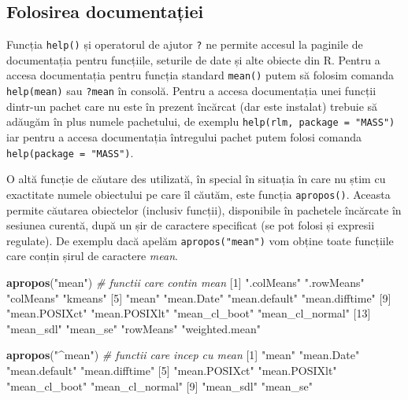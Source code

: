 \documentclass[]{article}
\newenvironment{Shaded}{\begin{snugshade}}{\end{snugshade}}
\newcommand{\CommentTok}[1]{\textcolor[rgb]{0.56,0.35,0.01}{\textit{#1}}}
\newcommand{\DecValTok}[1]{\textcolor[rgb]{0.00,0.00,0.81}{#1}}
\newcommand{\KeywordTok}[1]{\textcolor[rgb]{0.13,0.29,0.53}{\textbf{#1}}}
\newcommand{\NormalTok}[1]{#1}
\newcommand{\StringTok}[1]{\textcolor[rgb]{0.31,0.60,0.02}{#1}}
\begin{document}
\hypertarget{folosirea-documentaux21biei}{%
\subsection{Folosirea documentației}\label{folosirea-documentaux21biei}}

Funcția \texttt{help()} și operatorul de ajutor \texttt{?} ne permite
accesul la paginile de documentația pentru funcțiile, seturile de date
și alte obiecte din R. Pentru a accesa documentația pentru funcția
standard \texttt{mean()} putem să folosim comanda \texttt{help(mean)}
sau \texttt{?mean} în consolă. Pentru a accesa documentația unei funcții
dintr-un pachet care nu este în prezent încărcat (dar este instalat)
trebuie să adăugăm în plus numele pachetului, de exemplu
\texttt{help(rlm,\ package\ =\ "MASS")} iar pentru a accesa documentația
întregului pachet putem folosi comanda
\texttt{help(package\ =\ "MASS")}.

O altă funcție de căutare des utilizată, în special în situația în care
nu știm cu exactitate numele obiectului pe care îl căutăm, este funcția
\texttt{apropos()}. Aceasta permite căutarea obiectelor (inclusiv
funcții), disponibile în pachetele încărcate în sesiunea curentă, după
un șir de caractere specificat (se pot folosi și expresii regulate). De
exemplu dacă apelăm \texttt{apropos("mean")} vom obține toate funcțiile
care conțin șirul de caractere \emph{mean}.

\begin{Shaded}
\begin{Highlighting}[]
\KeywordTok{apropos}\NormalTok{(}\StringTok{"mean"}\NormalTok{) }\CommentTok{# functii care contin mean}
\NormalTok{ [}\DecValTok{1}\NormalTok{] }\StringTok{".colMeans"}      \StringTok{".rowMeans"}      \StringTok{"colMeans"}       \StringTok{"kmeans"}        
\NormalTok{ [}\DecValTok{5}\NormalTok{] }\StringTok{"mean"}           \StringTok{"mean.Date"}      \StringTok{"mean.default"}   \StringTok{"mean.difftime"} 
\NormalTok{ [}\DecValTok{9}\NormalTok{] }\StringTok{"mean.POSIXct"}   \StringTok{"mean.POSIXlt"}   \StringTok{"mean_cl_boot"}   \StringTok{"mean_cl_normal"}
\NormalTok{[}\DecValTok{13}\NormalTok{] }\StringTok{"mean_sdl"}       \StringTok{"mean_se"}        \StringTok{"rowMeans"}       \StringTok{"weighted.mean"} 

\KeywordTok{apropos}\NormalTok{(}\StringTok{"^mean"}\NormalTok{) }\CommentTok{# functii care incep cu mean}
\NormalTok{ [}\DecValTok{1}\NormalTok{] }\StringTok{"mean"}           \StringTok{"mean.Date"}      \StringTok{"mean.default"}   \StringTok{"mean.difftime"} 
\NormalTok{ [}\DecValTok{5}\NormalTok{] }\StringTok{"mean.POSIXct"}   \StringTok{"mean.POSIXlt"}   \StringTok{"mean_cl_boot"}   \StringTok{"mean_cl_normal"}
\NormalTok{ [}\DecValTok{9}\NormalTok{] }\StringTok{"mean_sdl"}       \StringTok{"mean_se"}       
\end{Highlighting}
\end{Shaded}
\end{document}
